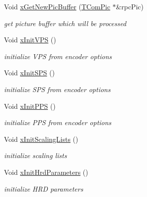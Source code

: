 \begin{DoxyCompactItemize}
\item 
Void \hyperlink{class_t_enc_top_a2d62cd40520860a32f0ac13685855a7e}{x\+Get\+New\+Pic\+Buffer} (\hyperlink{class_t_com_pic}{T\+Com\+Pic} $\ast$\&rpc\+Pic)
\begin{DoxyCompactList}\small\item\em get picture buffer which will be processed \end{DoxyCompactList}\item 
\mbox{\label{class_t_enc_top_aa1f5cfa276e1b82a8a42a6c6c6e17489}} 
Void \hyperlink{class_t_enc_top_aa1f5cfa276e1b82a8a42a6c6c6e17489}{x\+Init\+V\+PS} ()
\begin{DoxyCompactList}\small\item\em initialize V\+PS from encoder options \end{DoxyCompactList}\item 
\mbox{\label{class_t_enc_top_a762e5b1697944b1145cb35221e075d99}} 
Void \hyperlink{class_t_enc_top_a762e5b1697944b1145cb35221e075d99}{x\+Init\+S\+PS} ()
\begin{DoxyCompactList}\small\item\em initialize S\+PS from encoder options \end{DoxyCompactList}\item 
\mbox{\label{class_t_enc_top_a53f921385993c26c72caaf97e93aefd6}} 
Void \hyperlink{class_t_enc_top_a53f921385993c26c72caaf97e93aefd6}{x\+Init\+P\+PS} ()
\begin{DoxyCompactList}\small\item\em initialize P\+PS from encoder options \end{DoxyCompactList}\item 
\mbox{\label{class_t_enc_top_a35327c39381d523b83eb9eb733f333e2}} 
Void \hyperlink{class_t_enc_top_a35327c39381d523b83eb9eb733f333e2}{x\+Init\+Scaling\+Lists} ()
\begin{DoxyCompactList}\small\item\em initialize scaling lists \end{DoxyCompactList}\item 
Void \hyperlink{class_t_enc_top_a86ea6d845658a966b318b15366d189a0}{x\+Init\+Hrd\+Parameters} ()
\begin{DoxyCompactList}\small\item\em initialize H\+RD parameters \end{DoxyCompactList}\item 

\end{DoxyCompactItemize}
